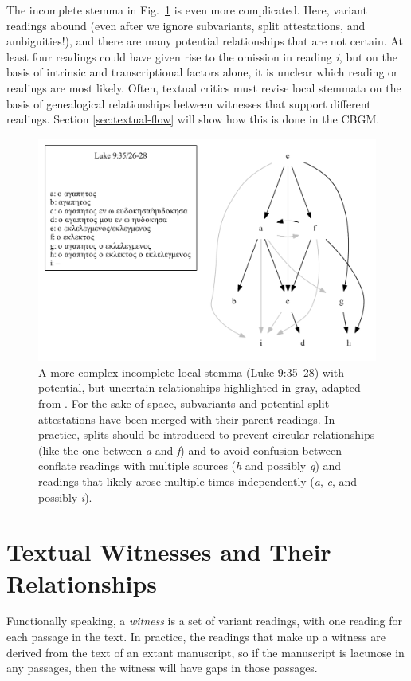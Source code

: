 \documentclass[a4paper, 12pt]{article}
\begin{document}
	\newpage
	
	The incomplete stemma in Fig.~\ref{fig:local-stemma-complex} is even more complicated. Here, variant readings abound (even after we ignore subvariants, split attestations, and ambiguities!), and there are many potential relationships that are not certain. At least four readings could have given rise to the omission in reading \emph{i}, but on the basis of intrinsic and transcriptional factors alone, it is unclear which reading or readings are most likely. Often, textual critics must revise local stemmata on the basis of genealogical relationships between witnesses that support different readings. Section \ref{sec:textual-flow} will show how this is done in the CBGM.
	
	\begin{figure}[h!]
		\centering
		\includegraphics[scale=0.6666]{../graphics/B03K9V35U26-28-local-stemma.pdf}
		\caption{A more complex incomplete local stemma (Luke 9:35–28) with potential, but uncertain relationships highlighted in gray, adapted from \cite{McCollum20}. For the sake of space, subvariants and potential split attestations have been merged with their parent readings. In practice, splits should be introduced to prevent circular relationships (like the one between \emph{a} and \emph{f}) and to avoid confusion between conflate readings with multiple sources (\emph{h} and possibly \emph{g}) and readings that likely arose multiple times independently (\emph{a}, \emph{c}, and possibly \emph{i}).}
		\label{fig:local-stemma-complex}
	\end{figure}
	
	\newpage
	
	\section{Textual Witnesses and Their Relationships}\label{sec:witnesses}
	Functionally speaking, a \emph{witness} is a set of variant readings, with one reading for each passage in the text. In practice, the readings that make up a witness are derived from the text of an extant manuscript, so if the manuscript is lacunose in any passages, then the witness will have gaps in those passages.
\end{document}
